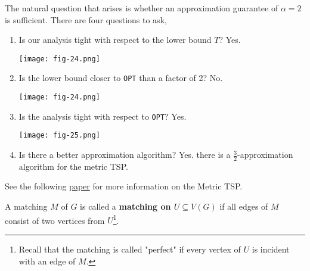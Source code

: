 The natural question that arises is whether an approximation guarantee of $\alpha = 2$ is sufficient. There are four questions to ask,
\begin{enumerate}
	\item Is our analysis tight with respect to the lower bound $T$? Yes.
	\begin{center}
			\texttt{[image: fig-24.png]}
	\end{center}

	\item Is the lower bound closer to \texttt{OPT} than a factor of 2? No.
	\begin{center}
			\texttt{[image: fig-24.png]}
	\end{center}

	\item Is the analysis tight with respect to \texttt{OPT}? Yes.
	\begin{center}
			\texttt{[image: fig-25.png]}
	\end{center}

	\item Is there a better approximation algorithm?
	\noindent Yes. there is a $\frac{3}{2}$-approximation algorithm for the metric TSP.
\end{enumerate}

\begin{marginfigure}
	See the following \href{https://link.springer.com/content/pdf/10.1007%2F978-0-387-30162-4_230.pdf}{paper} for more information on the Metric TSP.

\end{marginfigure}

\begin{defn}
	A matching $M$ of $G$ is called a \textbf{matching on $U \subseteq V(G)$} if all edges of $M$ consist of two vertices from $U$\footnote{Recall that the matching is called "perfect" if every vertex of $U$ is incident with an edge of $M$.}. 
\end{defn}

